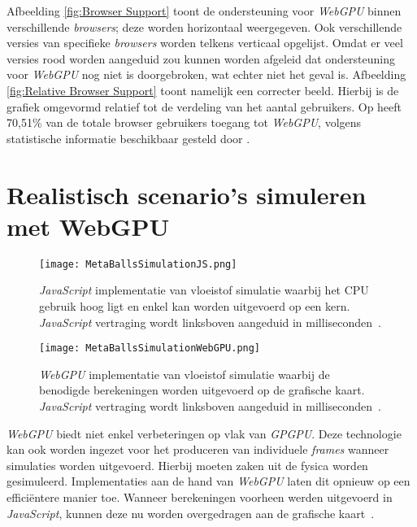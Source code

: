 \bigbreak{}
\date{}

Afbeelding \ref{fig:Browser Support} toont de ondersteuning voor \textit{WebGPU} binnen verschillende \textit{browsers}; deze worden horizontaal weergegeven. Ook verschillende versies van specifieke \textit{browsers} worden telkens verticaal opgelijst. Omdat er veel versies rood worden aangeduid zou kunnen worden afgeleid dat ondersteuning voor \textit{WebGPU} nog niet is doorgebroken, wat echter niet het geval is. Afbeelding \ref{fig:Relative Browser Support} toont namelijk een correcter beeld. Hierbij is de grafiek omgevormd relatief tot de verdeling van het aantal gebruikers. Op   heeft 70,51\% van de totale browser gebruikers toegang tot \textit{WebGPU}, volgens statistische informatie beschikbaar gesteld door \textcite{Deveria2024}.

\section{Realistisch scenario's simuleren met WebGPU}

\begin{figure}
    \texttt{[image: MetaBallsSimulationJS.png]}
    \caption[\textit{JavaScript} implementatie van vloeistof simulatie~\autocite{Jones2024}]{
        \textit{JavaScript} implementatie van vloeistof simulatie waarbij het CPU gebruik hoog ligt en enkel kan worden uitgevoerd op een kern. \textit{JavaScript} vertraging wordt linksboven aangeduid in milliseconden~\autocite{Jones2024}.
    }
    \label{fig:MetaBallsSimulationJS}
\end{figure}

\begin{figure}
    \texttt{[image: MetaBallsSimulationWebGPU.png]}
    \caption[\textit{WebGPU} implementatie van vloeistof simulatie~\autocite{Jones2024}]{
        \textit{WebGPU} implementatie van vloeistof simulatie waarbij de benodigde berekeningen worden uitgevoerd op de grafische kaart. \textit{JavaScript} vertraging wordt linksboven aangeduid in milliseconden~\autocite{Jones2024}.
    }
    \label{fig:MetaBallsSimulationWebGPU}
\end{figure}

\textit{WebGPU} biedt niet enkel verbeteringen op vlak van \textit{GPGPU}. Deze technologie kan ook worden ingezet voor het produceren van individuele \textit{frames} wanneer simulaties worden uitgevoerd. Hierbij moeten zaken uit de fysica worden gesimuleerd. Implementaties aan de hand van \textit{WebGPU} laten dit opnieuw op een efficiëntere manier toe. Wanneer berekeningen voorheen werden uitgevoerd in \textit{JavaScript}, kunnen deze nu worden overgedragen aan de grafische kaart~\autocite{Wallez2023}.

